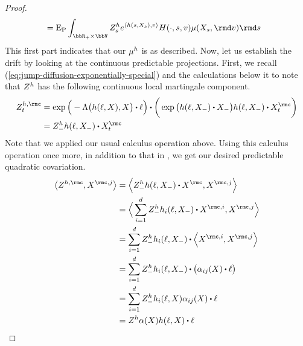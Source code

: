 \begin{proof}
\begin{align*}
    &= \Exp_\Prb \int_{\bbR_+ \times \vecSpace} \mgDensity^\twistFunc_s e^\prj{\twistFunc(s, \X_s)}{\markVar} H(\cdot, s, \markVar) \affJump(\X_s, \rmd\markVar) \rmd s  
  \end{align*}
  This first part indicates that our $\mu^h$ is as described.
  Now, let us establish the drift by looking at the continuous predictable projections.
  First, we recall (\ref{eq:jump-diffusion-exponentially-special}) and the calculations below it to note that $Z^h$ has the following continuous local martingale component.
  \begin{align*}
    \mgDensity^{\twistFunc,\rmc}_t 
    &= \exp\Big( -\ode\big(\twistFunc(\leb, \X), \X\big) \shortInt \leb \Big) \shortInt \bigg( \exp\big( \twistFunc(\leb, \X_-) \shortInt \X_- \big) \twistFunc(\leb, \X_-) \shortInt \X^\rmc_t\bigg)  \\
    &= \mgDensity^\twistFunc_- \twistFunc(\leb, \X_-) \shortInt \X^\rmc_t
  \end{align*}
  Note that we applied our usual calculus operation \cite[Remark I.4.37]{jacod2003} above.
  Using this calculus operation once more, in addition to that in \cite[Theorem I.4.40]{jacod2003}, we get our desired predictable quadratic covariation.
  \begin{align*}
    \bprj{\mgDensity^{\twistFunc,\rmc}}{\X^{\rmc,j}}
    &= \Bprj{\mgDensity^\twistFunc_- \twistFunc(\leb, \X_-) \shortInt \X^\rmc}{\X^{\rmc,j}} \\
    &= \Bprj{\sum_{i=1}^d \mgDensity^\twistFunc_- \twistFunc_i(\leb, \X_-) \shortInt \X^{\rmc,i}}{\X^{\rmc,j}} \\
    &= \sum_{i=1}^d \mgDensity^\twistFunc_- \twistFunc_i(\leb, \X_-) \shortInt \Bprj{\X^{\rmc,i}}{\X^{\rmc,j}} \\
    &= \sum_{i=1}^d \mgDensity^\twistFunc_- \twistFunc_i(\leb, \X_-) \shortInt \big( \affDiff_{ij}(\X) \shortInt \leb\big) \\
    &= \sum_{i=1}^d \mgDensity^\twistFunc_- \twistFunc_i(\leb, \X) \affDiff_{ij}(\X) \shortInt \leb \\
    &= \mgDensity^\twistFunc \affDiff(\X) \twistFunc(\leb, \X) \shortInt \leb \\
  \end{align*}
\end{proof}
